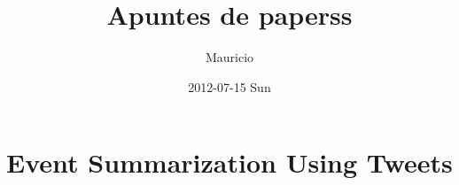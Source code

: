 \documentclass[11pt]{article}
\title{Apuntes de paperss}
\author{Mauricio}
\date{2012-07-15 Sun}
\begin{document}
\maketitle


\section{Event Summarization Using Tweets}
\label{sec-1}
\end{document}
